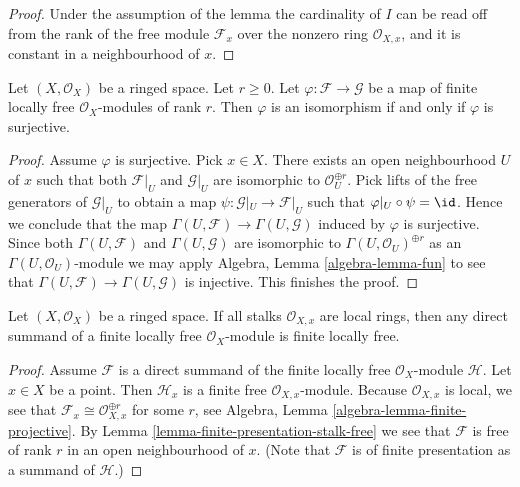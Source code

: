 \begin{proof}
Under the assumption of the lemma the cardinality of $I$ can be read off
from the rank of the free module $\mathcal{F}_x$ over the nonzero ring
$\mathcal{O}_{X, x}$, and it is constant in a neighbourhood of $x$.
\end{proof}

\begin{lemma}
\label{lemma-map-finite-locally-free}
Let $(X, \mathcal{O}_X)$ be a ringed space. Let $r \geq 0$.
Let $\varphi : \mathcal{F} \to \mathcal{G}$ be a map of finite
locally free $\mathcal{O}_X$-modules of rank $r$.
Then $\varphi$ is an isomorphism if and only if $\varphi$
is surjective.
\end{lemma}

\begin{proof}
Assume $\varphi$ is surjective. Pick $x \in X$.
There exists an open neighbourhood $U$ of $x$
such that both $\mathcal{F}|_U$ and $\mathcal{G}|_U$ are
isomorphic to $\mathcal{O}_U^{\oplus r}$.
Pick lifts of the free generators of $\mathcal{G}|_U$
to obtain a map $\psi : \mathcal{G}|_U \to \mathcal{F}|_U$
such that $\varphi|_U \circ \psi = \id$.
Hence we conclude that the map
$\Gamma(U, \mathcal{F}) \to \Gamma(U, \mathcal{G})$
induced by $\varphi$ is surjective. Since both
$\Gamma(U, \mathcal{F})$ and $\Gamma(U, \mathcal{G})$
are isomorphic to $\Gamma(U, \mathcal{O}_U)^{\oplus r}$
as an $\Gamma(U, \mathcal{O}_U)$-module we may
apply Algebra, Lemma \ref{algebra-lemma-fun} to see that
$\Gamma(U, \mathcal{F}) \to \Gamma(U, \mathcal{G})$
is injective. This finishes the proof.
\end{proof}

\begin{lemma}
\label{lemma-direct-summand-of-locally-free-is-locally-free}
Let $(X, \mathcal{O}_X)$ be a ringed space. If all stalks $\mathcal{O}_{X, x}$
are local rings, then any direct summand of a finite locally free
$\mathcal{O}_X$-module is finite locally free.
\end{lemma}

\begin{proof}
Assume $\mathcal{F}$ is a direct summand of the finite locally free
$\mathcal{O}_X$-module $\mathcal{H}$.
Let $x \in X$ be a point. Then $\mathcal{H}_x$ is a finite free
$\mathcal{O}_{X, x}$-module.
Because $\mathcal{O}_{X, x}$ is local, we see that
$\mathcal{F}_x \cong \mathcal{O}_{X, x}^{\oplus r}$ for some $r$, see
Algebra, Lemma \ref{algebra-lemma-finite-projective}.
By Lemma \ref{lemma-finite-presentation-stalk-free}
we see that $\mathcal{F}$ is free of rank $r$ in an open neighbourhood of $x$.
(Note that $\mathcal{F}$ is of finite presentation as a summand of
$\mathcal{H}$.)
\end{proof}







